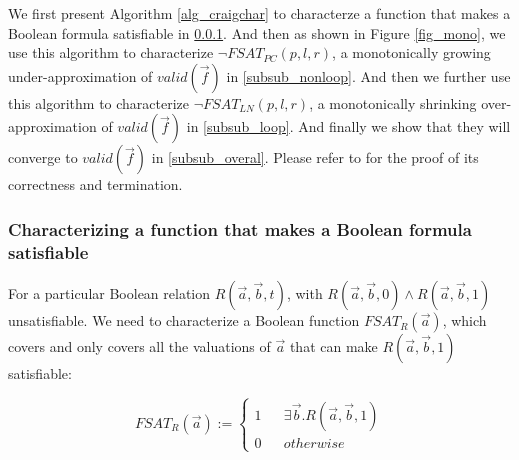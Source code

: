 \documentclass[runningheads,a4paper,orivec]{llncs}
\begin{document}

We first present Algorithm \ref{alg_craigchar} to characterze a function 
that makes a Boolean formula satisfiable in \ref{subsubsec_craig}.
And then as shown in Figure \ref{fig_mono},
we use this algorithm to characterize $\neg FSAT_{PC}(p,l,r)$,
a monotonically growing under-approximation of $valid(\vec{f})$ in \ref{subsub_nonloop}.
And then we further use this algorithm to characterize $\neg FSAT_{LN}(p,l,r)$,
a monotonically shrinking over-approximation of $valid(\vec{f})$ in \ref{subsub_loop}.
And finally we show that they will converge to $valid(\vec{f})$ in \ref{subsub_overal}.
Please refer to \cite{QinTODAES15} for the proof of its correctness and termination.



\subsubsection{Characterizing a function that makes a Boolean formula satisfiable}\label{subsubsec_craig}

For a particular Boolean relation $R(\vec{a},\vec{b},t)$, 
with $R(\vec{a},\vec{b},0)\wedge R(\vec{a},\vec{b},1)$ unsatisfiable.
We need to characterize a Boolean function $FSAT_R(\vec{a})$,
which covers and only covers all the valuations of $\vec{a}$ 
that can make $R(\vec{a},\vec{b},1)$ satisfiable:

% 


\begin{equation}\label{fchar}
FSAT_R(\vec{a}):=
\left\{
\begin{array}{rcl}
1 & & \exists\vec{b}.R(\vec{a},\vec{b},1) \\
0 & & otherwise
\end{array}
\right.
\end{equation}
\end{document}
